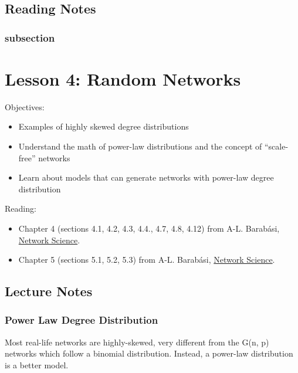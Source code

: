 \documentclass[11pt]{scrartcl} %
\begin{document}
\subsection{Reading Notes}

\subsubsection{subsection}
\textbf{}


\section{Lesson 4: Random Networks}

Objectives:
\begin{itemize}
	\item Examples of highly skewed degree distributions
	\item Understand the math of power-law distributions and the concept of “scale-free” networks
	\item Learn about models that can generate networks with power-law degree distribution
\end{itemize}

Reading:
\begin{itemize}
	\item Chapter 4 (sections 4.1, 4.2, 4.3, 4.4., 4.7, 4.8, 4.12) from A-L. Barabási, \href{http://networksciencebook.com/}{Network Science}.
	\item Chapter 5 (sections 5.1, 5.2, 5.3) from A-L. Barabási, \href{http://networksciencebook.com/}{Network Science}.
\end{itemize}

\subsection{Lecture Notes}

\subsubsection{Power Law Degree Distribution}
Most real-life networks are highly-skewed, very different from the G(n, p) networks which follow a binomial distribution. Instead, a power-law distribution is a better model.
\end{document}
